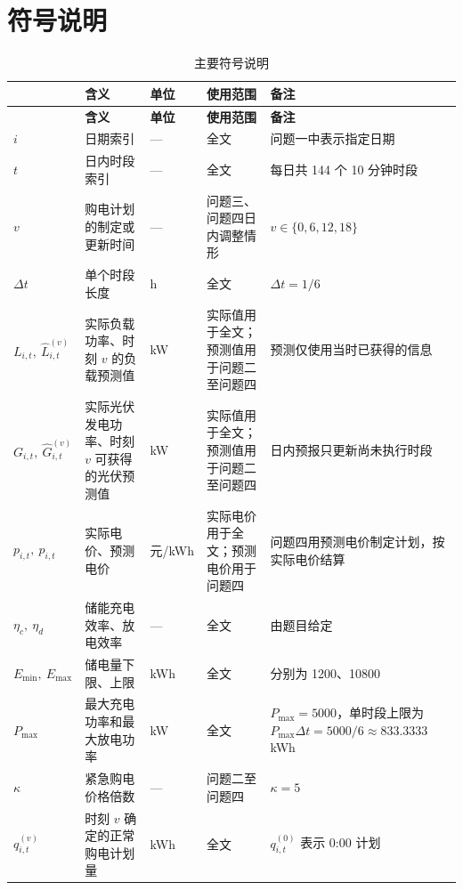 \documentclass[12pt,a4paper]{ctexart}
\renewcommand{\textbf}[1]{{\CJKfamily{heiti}\bfseries #1}}
\begin{document}
\section{符号说明}
\begingroup
\small
\setlength{\tabcolsep}{3pt}
\renewcommand{\arraystretch}{1.12}
\begin{longtable}{
  >{\centering\arraybackslash}p{2.8cm}
  >{\raggedright\arraybackslash}p{3.4cm}
  >{\centering\arraybackslash}p{1.5cm}
  >{\raggedright\arraybackslash}p{2.7cm}
  >{\raggedright\arraybackslash}p{4.3cm}}
\caption{主要符号说明}\label{tab:symbols}\\
\toprule
\textbf{符号} & \textbf{含义} & \textbf{单位} & \textbf{使用范围} & \textbf{备注} \\
\midrule
\endfirsthead
\toprule
\textbf{符号} & \textbf{含义} & \textbf{单位} & \textbf{使用范围} & \textbf{备注} \\
\midrule
\endhead
$i$ & 日期索引 & — & 全文 & 问题一中表示指定日期 \\[0.45em]
$t$ & 日内时段索引 & — & 全文 & 每日共 144 个 10 分钟时段 \\[0.45em]
$v$ & 购电计划的制定或更新时间 & — & 问题三、问题四日内调整情形 & $v\in\{0,6,12,18\}$ \\[0.45em]
$\Delta t$ & 单个时段长度 & h & 全文 & $\Delta t=1/6$ \\[0.45em]
$L_{i,t},\ \widehat L_{i,t}^{(v)}$ & 实际负载功率、时刻 $v$ 的负载预测值 & kW & 实际值用于全文；预测值用于问题二至问题四 & 预测仅使用当时已获得的信息 \\[0.45em]
$G_{i,t},\ \widehat G_{i,t}^{(v)}$ & 实际光伏发电功率、时刻 $v$ 可获得的光伏预测值 & kW & 实际值用于全文；预测值用于问题二至问题四 & 日内预报只更新尚未执行时段 \\[0.45em]
$p_{i,t},\ \widehat p_{i,t}$ & 实际电价、预测电价 & 元/kWh & 实际电价用于全文；预测电价用于问题四 & 问题四用预测电价制定计划，按实际电价结算 \\[0.45em]
$\eta_c,\ \eta_d$ & 储能充电效率、放电效率 & — & 全文 & 由题目给定 \\[0.45em]
$E_{\min},\ E_{\max}$ & 储电量下限、上限 & kWh & 全文 & 分别为 1200、10800 \\[0.45em]
$P_{\max}$ & 最大充电功率和最大放电功率 & kW & 全文 & $P_{\max}=5000$，单时段上限为 $P_{\max}\Delta t=5000/6\approx833.3333$ kWh \\[0.45em]
$\kappa$ & 紧急购电价格倍数 & — & 问题二至问题四 & $\kappa=5$ \\[0.45em]
$q_{i,t}^{(v)}$ & 时刻 $v$ 确定的正常购电计划量 & kWh & 全文 & $q_{i,t}^{(0)}$ 表示 0:00 计划 \\[0.45em]

\end{longtable}
\end{document}
